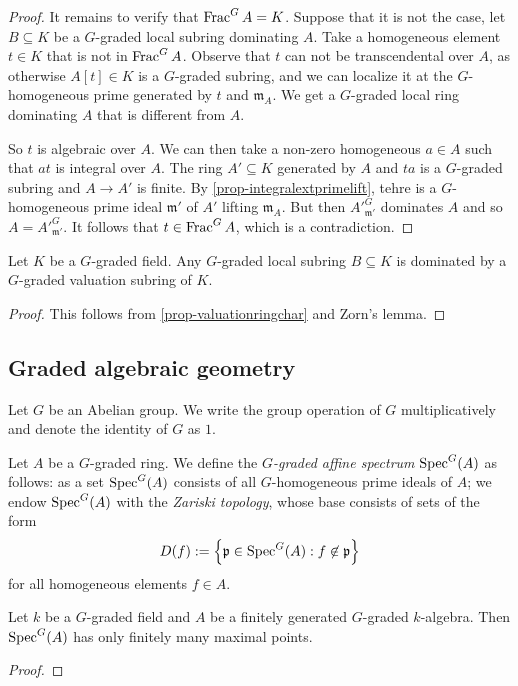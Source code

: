 \begin{proof}
    It remains to verify that $\operatorname{Frac}^G A=K$. Suppose that it is not the case, let $B\subseteq K$ be a $G$-graded local subring dominating $A$. Take a homogeneous element $t\in K$ that is not in $\operatorname{Frac}^G A$. Observe that $t$ can not be transcendental over $A$, as otherwise $A[t]\in K$ is a $G$-graded subring, and we can localize it at the $G$-homogeneous prime generated by $t$ and $\mathfrak{m}_A$. We get a $G$-graded local ring dominating $A$ that is different from $A$.

    So $t$ is algebraic over $A$. We can then take a non-zero homogeneous $a\in A$ such that $at$ is integral over $A$. The ring $A'\subseteq K$ generated by $A$ and $ta$ is a $G$-graded subring and $A\rightarrow A'$ is finite. By \cref{prop-integralextprimelift}, tehre is a $G$-homogeneous prime ideal $\mathfrak{m}'$ of $A'$ lifting $\mathfrak{m}_A$. But then $A'^G_{\mathfrak{m}'}$ dominates $A$ and so $A=A'^G_{\mathfrak{m}'}$. It follows that $t\in \operatorname{Frac}^G A$, which is a contradiction.
\end{proof}

\begin{corollary}
    Let $K$ be a $G$-graded field. Any $G$-graded local subring $B\subseteq K$ is dominated by a $G$-graded valuation subring of $K$.
\end{corollary}
\begin{proof}
    This follows from \cref{prop-valuationringchar} and Zorn's lemma.
\end{proof}

\subsection{Graded algebraic geometry}
Let $G$ be an Abelian group. We write the group operation of $G$ multiplicatively and denote the identity of $G$ as $1$.

\begin{definition}
    Let $A$ be a $G$-graded ring. We define the \emph{$G$-graded affine spectrum} $\operatorname{Spec}^G(A)$ as follows: as a set $\operatorname{Spec}^G (A)$ consists of all $G$-homogeneous prime ideals of $A$; we endow $\operatorname{Spec}^G(A)$ with the \emph{Zariski topology}, whose base consists of sets of the form 
    \[
        D(f):=\left\{\mathfrak{p}\in \operatorname{Spec}^G(A): f\not\in \mathfrak{p}\right\}
    \]
    for all homogeneous elements $f\in A$.
\end{definition}

\begin{lemma}
    Let $k$ be a $G$-graded field and $A$ be a finitely generated $G$-graded $k$-algebra. Then $\operatorname{Spec}^G(A)$ has only finitely many maximal points.
\end{lemma}
\begin{proof}
    
\end{proof}

\printbibliography
